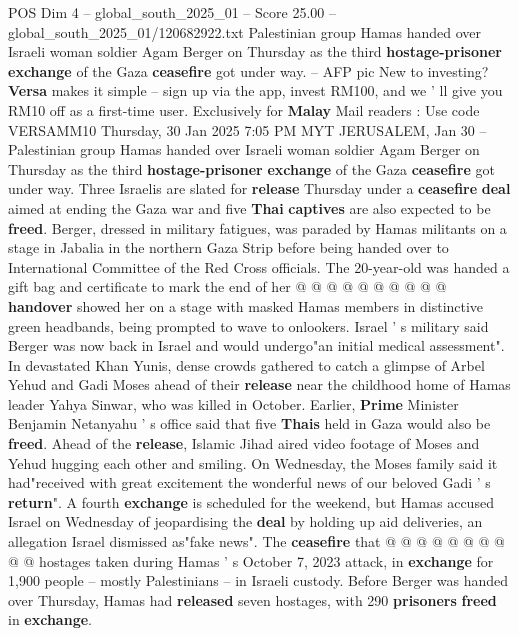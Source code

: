 \begin{textsample}{POS Dim 4 – global\_south\_2025\_01 – Score 25.00 – global\_south\_2025\_01/120682922.txt}  \label{ex:f4_pos_018}
Palestinian group Hamas handed over Israeli woman soldier Agam Berger on Thursday as the third \textbf{hostage-prisoner} \textbf{exchange} of the Gaza \textbf{ceasefire} got under way. -- AFP pic New to investing? \textbf{Versa} makes it simple -- sign up via the app, invest RM100, and we ' ll give you RM10 off as a first-time user.
Exclusively for \textbf{Malay} Mail readers : Use code VERSAMM10 Thursday, 30 Jan 2025 7:05 PM MYT JERUSALEM, Jan 30 -- Palestinian group Hamas handed over Israeli woman soldier Agam Berger on Thursday as the third \textbf{hostage-prisoner} \textbf{exchange} of the Gaza \textbf{ceasefire} got under way.
Three Israelis are slated for \textbf{release} Thursday under a \textbf{ceasefire} \textbf{deal} aimed at ending the Gaza war and five \textbf{Thai} \textbf{captives} are also expected to be \textbf{freed}.
Berger, dressed in military fatigues, was paraded by Hamas militants on a stage in Jabalia in the northern Gaza Strip before being handed over to International Committee of the Red Cross officials.
The 20-year-old was handed a gift bag and certificate to mark the end of her @ @ @ @ @ @ @ @ @ @ \textbf{handover} showed her on a stage with masked Hamas members in distinctive green headbands, being prompted to wave to onlookers.
Israel ' s military said Berger was now back in Israel and would undergo"an initial medical assessment".
In devastated Khan Yunis, dense crowds gathered to catch a glimpse of Arbel Yehud and Gadi Moses ahead of their \textbf{release} near the childhood home of Hamas leader Yahya Sinwar, who was killed in October.
Earlier, \textbf{Prime} Minister Benjamin Netanyahu ' s office said that five \textbf{Thais} held in Gaza would also be \textbf{freed}.
Ahead of the \textbf{release}, Islamic Jihad aired video footage of Moses and Yehud hugging each other and smiling.
On Wednesday, the Moses family said it had"received with great excitement the wonderful news of our beloved Gadi ' s \textbf{return}".
A fourth \textbf{exchange} is scheduled for the weekend, but Hamas accused Israel on Wednesday of jeopardising the \textbf{deal} by holding up aid deliveries, an allegation Israel dismissed as"fake news".
The \textbf{ceasefire} that @ @ @ @ @ @ @ @ @ @ hostages taken during Hamas ' s October 7, 2023 attack, in \textbf{exchange} for 1,900 people -- mostly Palestinians -- in Israeli custody.
Before Berger was handed over Thursday, Hamas had \textbf{released} seven hostages, with 290 \textbf{prisoners} \textbf{freed} in \textbf{exchange}.

\end{textsample}

